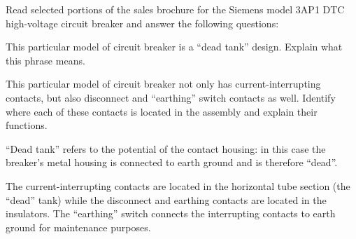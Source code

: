 

Read selected portions of the sales brochure for the Siemens model 3AP1 DTC high-voltage circuit breaker and answer the following questions:

\vskip 10pt

This particular model of circuit breaker is a ``dead tank'' design.  Explain what this phrase means.

\vskip 10pt

This particular model of circuit breaker not only has current-interrupting contacts, but also disconnect and ``earthing'' switch contacts as well.  Identify where each of these contacts is located in the assembly and explain their functions.

\vskip 10pt







 






``Dead tank'' refers to the potential of the contact housing: in this case the breaker's metal housing is connected to earth ground and is therefore ``dead''.

\vskip 10pt

The current-interrupting contacts are located in the horizontal tube section (the ``dead'' tank) while the disconnect and earthing contacts are located in the insulators.  The ``earthing'' switch connects the interrupting contacts to earth ground for maintenance purposes.




